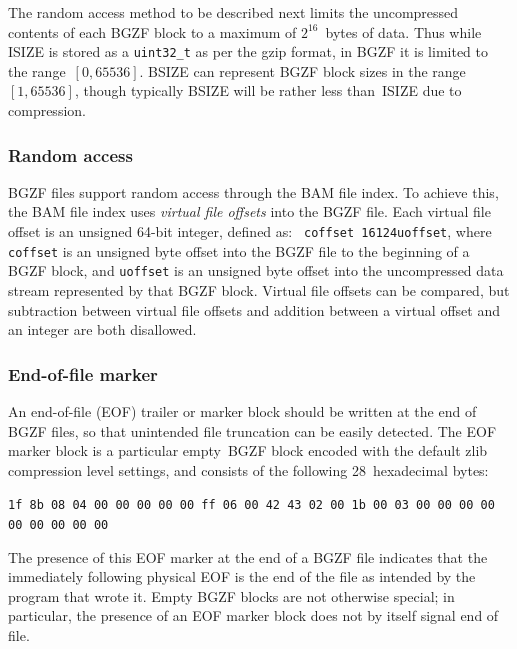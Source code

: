 \documentclass[10pt]{article}
\begin{document}
The random access method to be described next limits the uncompressed
contents of each BGZF block to a maximum of $2^{16}$~bytes of data.
Thus while {\sf ISIZE} is stored as a {\tt uint32\_t} as per the gzip format,
in BGZF it is limited to the range~$[0,65536]$.
{\sf BSIZE} can represent BGZF block sizes in the range~$[1,65536]$, though
typically {\sf BSIZE} will be rather less than~{\sf ISIZE} due to compression.

\subsubsection{Random access}

BGZF files support random access through the BAM file index. To achieve
this, the BAM file index uses \emph{virtual file offsets} into the BGZF
file. Each virtual file offset is an unsigned 64-bit integer, defined as: {\tt
  coffset 16\char124uoffset}, where {\tt coffset} is an
unsigned byte offset into the BGZF file to the beginning of a BGZF
block, and {\tt uoffset} is an unsigned byte offset into the
uncompressed data stream represented by that BGZF block. Virtual file
offsets can be compared, but subtraction between virtual file offsets
and addition between a virtual offset and an integer are both
disallowed.

\subsubsection{End-of-file marker}

An end-of-file (EOF) trailer or marker block should be written at the end
of BGZF files, so that unintended file truncation can be easily detected.
The EOF marker block is a particular empty\footnotemark\ BGZF block
encoded with the default {\sf zlib} compression level settings,
and consists of the following 28~hexadecimal bytes:
\begin{center}
\texttt{1f 8b 08 04 00 00 00 00 00 ff 06 00 42 43 02 00 1b 00 03 00 00 00 00 00 00 00 00 00}
\end{center}


\noindent
The presence of this EOF marker at the end of a BGZF file indicates that the
immediately following physical EOF is the end of the file as intended by the
program that wrote it.
Empty BGZF blocks are not otherwise special; in particular, the presence of
an EOF marker block does not by itself signal end of file.\footnotemark
\end{document}

